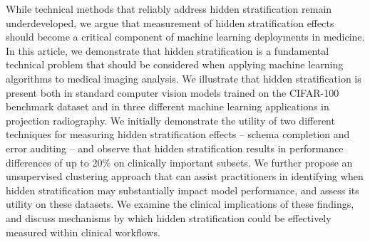 \documentclass{article}
\begin{document}
While technical methods that reliably address hidden stratification remain underdeveloped, we argue that measurement of hidden stratification effects should become a critical component of machine learning deployments in medicine.  
In this article, we demonstrate that hidden stratification is a fundamental technical problem that should be considered when applying machine learning algorithms to medical imaging analysis.  
We illustrate that hidden stratification is present both in standard computer vision models trained on the CIFAR-100 benchmark dataset and in three different machine learning applications in projection radiography.  
We initially demonstrate the utility of two different techniques for measuring hidden stratification effects -- schema completion and error auditing -- and observe that hidden stratification results in performance differences of up to 20\% on clinically important subsets.  
We further propose an unsupervised clustering approach that can assist practitioners in identifying when hidden stratification may substantially impact model performance, and assess its utility on these datasets.
We examine the clinical implications of these findings, and discuss mechanisms by which hidden stratification could be effectively measured within clinical workflows.
\end{document}
